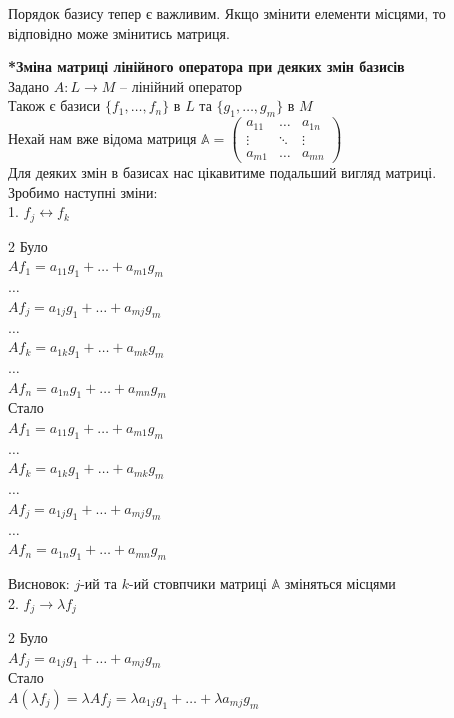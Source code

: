 \documentclass{math_library}
\begin{document}
	\begin{remark}
	Порядок базису тепер є важливим. Якщо змінити елементи місцями, то відповідно може змінитись матриця.
	\end{remark}
	\iffalse
	\textbf{*Зміна матриці лінійного оператора при деяких змін базисів}\\
	Задано $A: L \to M$ -- лінійний оператор \\ Також є базиси $\{f_1,\dots,f_n\}$ в $L$ та $\{g_1,\dots,g_m\}$ в $M$\\
	Нехай нам вже відома матриця $\mathbb{A} = \begin{pmatrix}
	a_{11} & \dots & a_{1n} \\
	\vdots & \ddots & \vdots \\
	a_{m1} & \dots & a_{mn}
	\end{pmatrix}$\\
	Для деяких змін в базисах нас цікавитиме подальший вигляд матриці.\\
	Зробимо наступні зміни:
	\bigskip \\
	1. $f_j \longleftrightarrow f_k$
\multicolsep=0pt
	\begin{multicols}{2}
	Було \\
$Af_1 = a_{11}g_1 + \dots + a_{m1}g_m$ \\
$\dots$ \\
$Af_j = a_{1j}g_1 + \dots + a_{mj}g_m$ \\
$\dots$ \\
$Af_k = a_{1k}g_1 + \dots + a_{mk}g_m$ \\
$\dots$ \\
$Af_n = a_{1n}g_1 + \dots + a_{mn}g_m$
	\columnbreak
	\\
	Стало \\
$Af_1 = a_{11}g_1 + \dots + a_{m1}g_m$ \\
$\dots$ \\
$Af_k = a_{1k}g_1 + \dots + a_{mk}g_m$\\
$\dots$ \\
$Af_j = a_{1j}g_1 + \dots + a_{mj}g_m$\\
$\dots$ \\
$Af_n = a_{1n}g_1 + \dots + a_{mn}g_m$
	\end{multicols}
	Висновок: $j$-ий та $k$-ий стовпчики матриці $\mathbb{A}$ зміняться місцями
	\bigskip \\
	2. $f_j \rightarrow \lambda f_j$
\multicolsep=0pt
	\begin{multicols}{2}
	Було \\
$Af_j = a_{1j}g_1 + \dots + a_{mj}g_m$
	\columnbreak
	\\
	Стало \\
$A(\lambda f_j) = \lambda Af_j = \lambda a_{1j}g_1 + \dots + \lambda a_{mj}g_m$
	\end{multicols}
\end{document}
